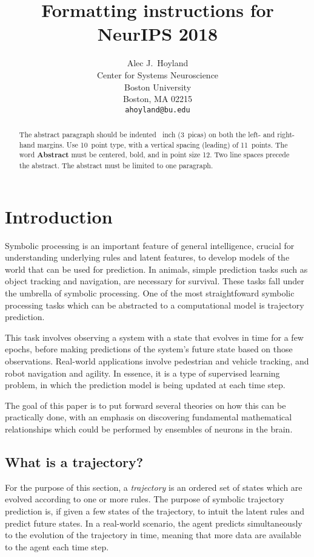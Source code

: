 \documentclass{article}
\title{Formatting instructions for NeurIPS 2018}
\author{%
  Alec J.~Hoyland \\
  Center for Systems Neuroscience\\
  Boston University\\
  Boston, MA 02215 \\
  \texttt{ahoyland@bu.edu} \\
}
\begin{document}
\maketitle

\begin{abstract}
  The abstract paragraph should be indented ~inch (3~picas) on
  both the left- and right-hand margins. Use 10~point type, with a vertical
  spacing (leading) of 11~points.  The word \textbf{Abstract} must be centered,
  bold, and in point size 12. Two line spaces precede the abstract. The abstract
  must be limited to one paragraph.
\end{abstract}

\section{Introduction}

Symbolic processing is an important feature of general intelligence,
crucial for understanding underlying rules and latent features,
to develop models of the world that can be used for prediction.
In animals, simple prediction tasks such as object tracking and navigation,
are necessary for survival.
These tasks fall under the umbrella of symbolic processing.
One of the most straightfoward symbolic processing tasks
which can be abstracted to a computational model is trajectory prediction.

This task involves observing a system with a state that evolves in time
for a few epochs, before making predictions of the system's future state
based on those observations.
Real-world applications involve pedestrian and vehicle tracking, and
robot navigation and agility.
In essence, it is a type of supervised learning problem,
in which the prediction model is being updated at each time step.

The goal of this paper is to put forward several theories on how this can be practically done,
with an emphasis on discovering fundamental mathematical relationships
which could be performed by ensembles of neurons in the brain.

\subsection{What is a trajectory?}

For the purpose of this section, a \textit{trajectory} is an ordered set of states
which are evolved according to one or more rules.
The purpose of symbolic trajectory prediction is, if given a few states of the trajectory,
to intuit the latent rules and predict future states.
In a real-world scenario, the agent predicts simultaneously to the evolution of the trajectory in time,
meaning that more data are available to the agent each time step.
\end{document}
